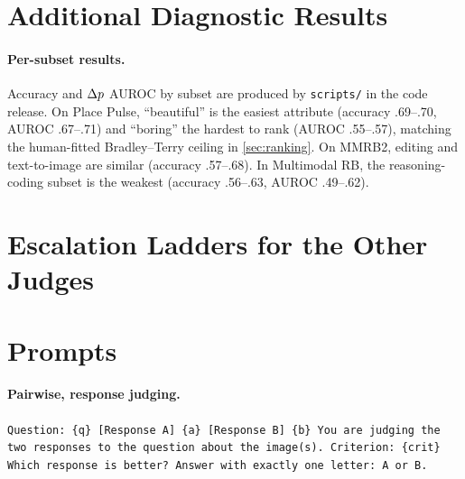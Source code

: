 \section{Additional Diagnostic Results}\label{app:more}
\begin{table}[h]
\centering\small
\caption{Diagnostic results for Qwen3.5-9B (columns as in \cref{tab:diag}).}\label{tab:diag35}

\end{table}
\begin{table}[h]
\centering\small
\caption{Diagnostic results for Qwen2.5-VL-7B (columns as in \cref{tab:diag}).}\label{tab:diag25}

\end{table}
\paragraph{Per-subset results.} Accuracy and $\Delta p$ AUROC by subset are produced by \texttt{scripts/} in the code release. On Place Pulse, ``beautiful'' is the easiest attribute (accuracy .69--.70, AUROC .67--.71) and ``boring'' the hardest to rank (AUROC .55--.57), matching the human-fitted Bradley--Terry ceiling in \cref{sec:ranking}. On MMRB2, editing and text-to-image are similar (accuracy .57--.68). In Multimodal RB, the reasoning-coding subset is the weakest (accuracy .56--.63, AUROC .49--.62).

\section{Escalation Ladders for the Other Judges}\label{app:ladders}
\begin{table}[h]
\centering\small
\caption{Certified automation (\%) for Qwen3.5-9B as the small judge (columns as in \cref{tab:ladder}).}

\end{table}
\begin{table}[h]
\centering\small
\caption{Certified automation (\%) for Qwen2.5-VL-7B as the small judge (columns as in \cref{tab:ladder}).}

\end{table}

\section{Prompts}\label{app:prompts}
\paragraph{Pairwise, response judging.}
\texttt{Question: \{q\} [Response A] \{a\} [Response B] \{b\} You are judging the two responses to the question about the image(s). Criterion: \{crit\} Which response is better? Answer with exactly one letter: A or B.}

